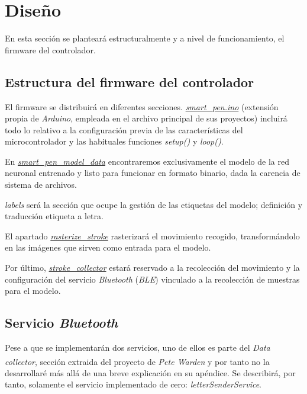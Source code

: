 \section{Diseño}
En esta sección se planteará estructuralmente y a nivel de funcionamiento,
el firmware del controlador.
\subsection{Estructura del firmware del controlador}
El firmware se distribuirá en diferentes secciones.
\href{https://github.com/AntonioPriego/SmartPen/blob/main/Sketch/smart_pen/smart_pen.ino}{\textit{smart\_pen.ino}}
(extensión propia de \textit{Arduino}, empleada en
el archivo principal de sus proyectos) incluirá todo lo relativo a la
configuración previa de las características del microcontrolador y las
habituales funciones \textit{setup()} y \textit{loop()}.

En
\href{https://github.com/AntonioPriego/SmartPen/blob/main/Sketch/smart_pen/smart_pen_model_data.cpp}{\textit{smart\_pen\_model\_data}}
encontraremos exclusivamente el modelo
de la red neuronal entrenado y listo para funcionar en formato binario,
dada la carencia de sistema de archivos.

\textit{labels} será la sección que ocupe la gestión de las etiquetas del
modelo; definición y traducción etiqueta a letra.

El apartado
\href{https://github.com/AntonioPriego/SmartPen/blob/main/Sketch/smart_pen/smart_pen_model_data.cpp}{\textit{rasterize\_stroke}}
rasterizará el movimiento recogido,
transformándolo en las imágenes que sirven como entrada para el modelo.

Por último,
\href{https://github.com/AntonioPriego/SmartPen/blob/main/Sketch/smart_pen/stroke_collector.cpp}{\textit{stroke\_collector}}
estará reservado a la recolección
del movimiento y la configuración del servicio \textit{Bluetooth} (\textit{BLE})
vinculado a la recolección de muestras para el modelo.

\subsection{Servicio \textit{Bluetooth}\label{servBLE}}
Pese a que se implementarán dos servicios, uno de ellos es parte del \textit{Data collector},
sección extraida del proyecto de \textit{Pete Warden}\textsuperscript{\cite{petewardenmw}}
y por tanto no la desarrollaré más allá de una breve explicación en su apéndice.
Se describirá, por tanto, solamente el servicio implementado de cero:
\textit{letterSenderService}.

